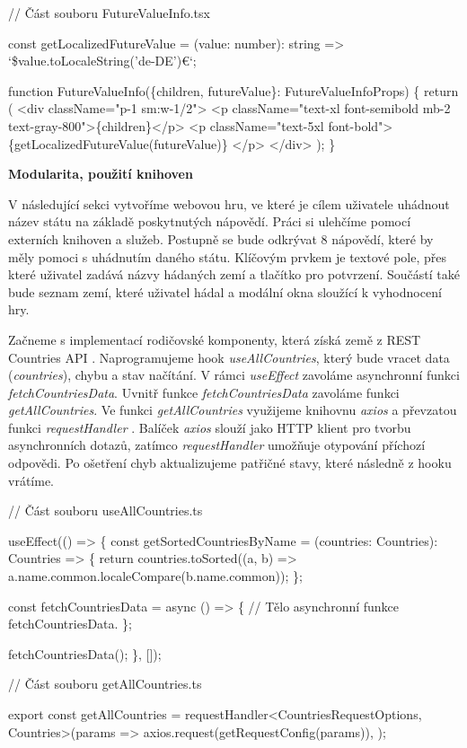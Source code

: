 \begin{prog}
// Část souboru FutureValueInfo.tsx

const getLocalizedFutureValue = (value: number): string => 
  `\${value.toLocaleString('de-DE')}€`;

function FutureValueInfo(\{children, futureValue\}: FutureValueInfoProps) \{
  return (
    <div className="p-1 sm:w-1/2">
      <p className="text-xl font-semibold mb-2 text-gray-800">\{children\}</p>
      <p className="text-5xl font-bold">
        \{getLocalizedFutureValue(futureValue)\}
      </p>
    </div>
  );
\}
\end{prog}

\begin{flushleft}
  \textbf{Modularita, použití knihoven}
\end{flushleft}

V následující sekci vytvoříme webovou hru, ve které je cílem uživatele uhádnout název státu na základě poskytnutých nápovědí. Práci si ulehčíme pomocí externích knihoven a služeb.
Postupně se bude odkrývat 8 nápovědí, které by měly pomoci s uhádnutím daného státu. Klíčovým prvkem je textové pole, přes které uživatel zadává názvy hádaných zemí a tlačítko pro potvrzení. 
Součástí také bude seznam zemí, které uživatel hádal a modální okna sloužící k vyhodnocení hry.

Začneme s implementací rodičovské komponenty, která získá země z REST Countries API \cite{restcountriesapi}. Naprogramujeme hook \emph{useAllCountries}, který bude vracet data (\emph{countries}), chybu a stav načítání. 
V rámci \emph{useEffect} zavoláme asynchronní funkci \emph{fetchCountriesData}. Uvnitř funkce \emph{fetchCountriesData} zavoláme funkci \emph{getAllCountries}. 
Ve funkci \emph{getAllCountries} využijeme knihovnu \emph{axios} \cite{axioslib} a převzatou funkci \emph{requestHandler} \cite{axiosrequesthandler}. 
Balíček \emph{axios} slouží jako HTTP klient pro tvorbu asynchronních dotazů, zatímco \emph{requestHandler} umožňuje otypování příchozí odpovědi. Po ošetření chyb aktualizujeme patřičné stavy, které následně z hooku vrátíme. 

\begin{prog}
// Část souboru useAllCountries.ts

useEffect(() => \{
  const getSortedCountriesByName = (countries: Countries): Countries => \{
    return countries.toSorted((a, b) => 
      a.name.common.localeCompare(b.name.common));
  \};

  const fetchCountriesData = async () => \{
    // Tělo asynchronní funkce fetchCountriesData.
  \};

  fetchCountriesData();
\}, []);

// Část souboru getAllCountries.ts

export const getAllCountries = 
  requestHandler<CountriesRequestOptions, Countries>(params =>
    axios.request(getRequestConfig(params)),
  );
\end{prog}

